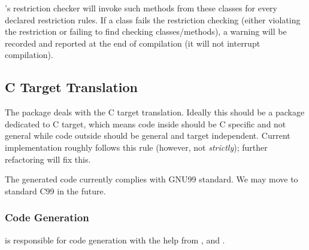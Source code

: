 \documentclass[12pt]{article}
\begin{document}
\rjc 's restriction checker will invoke such methods from these classes 
for every declared restriction rules.
If a class fails the restriction checking (either violating the restriction or 
failing to find checking classes/methods), a warning will be recorded
and reported at the end of compilation (it will not interrupt compilation). 

\subsection{C Target Translation}

The  package deals with 
the C target translation. Ideally this should be a package 
dedicated to C target, which means code inside should be C specific 
and not general while code outside should be general and 
target independent. 
Current implementation roughly follows this rule 
(however, not \emph{strictly}); further refactoring will fix this. 

The generated code currently complies with GNU99 standard.  
We may move to standard C99 in the future. 

\subsubsection{Code Generation}

 is responsible for code generation
with the help from , 
and . 
\end{document}
